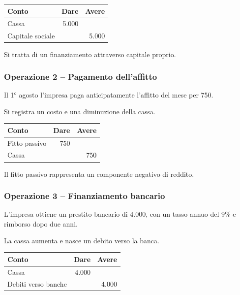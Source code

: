 \begin{center}
\begin{tabular}{|l|r|r|}
\hline
\textbf{Conto} & \textbf{Dare} & \textbf{Avere} \\
\hline
Cassa & 5.000 & \\
\hline
Capitale sociale & & 5.000 \\
\hline
\end{tabular}
\end{center}

\noindent Si tratta di un finanziamento
attraverso capitale proprio.


\subsubsection*{Operazione 2 -- Pagamento dell'affitto}

\noindent Il 1° agosto l'impresa paga anticipatamente
l'affitto del mese per 750.

\medskip

\noindent Si registra un costo e una diminuzione
della cassa.

\begin{center}
\begin{tabular}{|l|r|r|}
\hline
\textbf{Conto} & \textbf{Dare} & \textbf{Avere} \\
\hline
Fitto passivo & 750 & \\
\hline
Cassa & & 750 \\
\hline
\end{tabular}
\end{center}

\noindent Il fitto passivo rappresenta
un componente negativo di reddito.


\subsubsection*{Operazione 3 -- Finanziamento bancario}

\noindent L'impresa ottiene un prestito
bancario di 4.000, con un tasso annuo
del 9\% e rimborso dopo due anni.

\medskip

\noindent La cassa aumenta e nasce
un debito verso la banca.

\begin{center}
\begin{tabular}{|l|r|r|}
\hline
\textbf{Conto} & \textbf{Dare} & \textbf{Avere} \\
\hline
Cassa & 4.000 & \\
\hline
Debiti verso banche & & 4.000 \\
\hline
\end{tabular}
\end{center}


